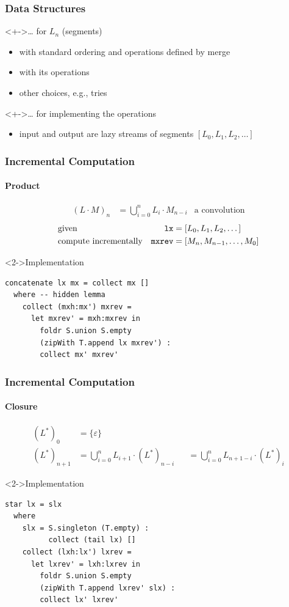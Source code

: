 \documentclass[pdftex]{beamer}
\begin{document}
\begin{frame}
  \frametitle{Data Structures}
  \begin{block}<+->{\dots{} for $L_n$ (segments)}
    \begin{itemize}
    \item \code{[T.Text]} with standard ordering and operations defined by merge
    \item {} with its operations
    \item other choices, e.g., tries
    \end{itemize}
  \end{block}
  \begin{block}<+->{\dots{} for implementing the operations}
    \begin{itemize}
    \item input and output are lazy streams of segments $[L_0, L_1, L_2, \dots]$
    \end{itemize}
  \end{block}
\end{frame}
\begin{frame}[fragile]
  \frametitle{Incremental Computation}
  \framesubtitle{Product}
  \vspace{-2\baselineskip}
  \begin{align*}
    (L \cdot M)_n & = \bigcup_{i=0}^n L_i \cdot M_{n-i} & \text{a convolution}
  \end{align*}
  \begin{align*}
    & \text{given} & \code{lx} &= [L_0, L_1, L_2, \dots ]\\
     & \text{compute incrementally} &
    \code{mxrev} &= [M_n, M_{n-1}, \dots , M_0]
  \end{align*}
  \begin{block}<2->{Implementation}
\begin{lstlisting}[numbers=none]
concatenate lx mx = collect mx []
  where -- hidden lemma
    collect (mxh:mx') mxrev =
      let mxrev' = mxh:mxrev in
        foldr S.union S.empty
        (zipWith T.append lx mxrev') :
        collect mx' mxrev'
\end{lstlisting}
  \end{block}
\end{frame}
\begin{frame}[fragile]
  \frametitle{Incremental Computation}
  \framesubtitle{Closure}
  \vspace{-2\baselineskip}
  \begin{align*}
    (L^*)_0 & = \{\varepsilon\} \\
    (L^*)_{n+1} & = \bigcup_{i=0}^n L_{i+1} \cdot (L^*)_{n-i}
                  &&= \bigcup_{i=0}^n L_{n+1-i} \cdot (L^*)_i
  \end{align*}
  \begin{block}<2->{Implementation}
\begin{lstlisting}[numbers=none]
star lx = slx
  where
    slx = S.singleton (T.empty) :
          collect (tail lx) []
    collect (lxh:lx') lxrev =
      let lxrev' = lxh:lxrev in
        foldr S.union S.empty
        (zipWith T.append lxrev' slx) :
        collect lx' lxrev'
\end{lstlisting}
  \end{block}
\end{frame}
\end{document}
